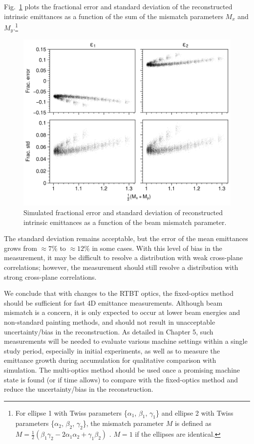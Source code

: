 Fig.~\ref{fig:mismatch} plots the fractional error and standard deviation of the reconstructed intrinsic emittances as a function of the sum of the mismatch parameters $M_x$ and $M_y$.\footnote{For ellipse 1 with Twiss parameters \{$\alpha_1$, $\beta_1$, $\gamma_1$\} and ellipse 2 with Twiss parameters \{$\alpha_2$, $\beta_2$, $\gamma_2$\}, the mismatch parameter $M$ is defined as $M = \frac{1}{2}(\beta_1\gamma_2 - 2\alpha_1\alpha_2 + \gamma_1\beta_2)$ \cite{book:Minty2003}. $M = 1$ if the ellipses are identical.} 
%
\begin{figure}[!p]
    \centering
    \includegraphics{Images/chapter4/mismatch.png}
    \caption{Simulated fractional error and standard deviation of reconstructed intrinsic emittances as a function of the beam mismatch parameter.}
    \label{fig:mismatch}
\end{figure}
%
The standard deviation remains acceptable, but the error of the mean emittances grows from $\approx 7\%$ to $\approx 12\%$ in some cases. With this level of bias in the measurement, it may be difficult to resolve a distribution with weak cross-plane correlations; however, the measurement should still resolve a distribution with strong cross-plane correlations. 

We conclude that with changes to the RTBT optics, the fixed-optics method should be sufficient for fast 4D emittance measurements. Although beam mismatch is a concern, it is only expected to occur at lower beam energies and non-standard painting methods, and should not result in unacceptable uncertainty/bias in the reconstruction. As detailed in Chapter 5, such measurements will be needed to evaluate various machine settings within a single study period, especially in initial experiments, as well as to measure the emittance growth during accumulation for qualitative comparison with simulation. The multi-optics method should be used once a promising machine state is found (or if time allows) to compare with the fixed-optics method and reduce the uncertainty/bias in the reconstruction.


